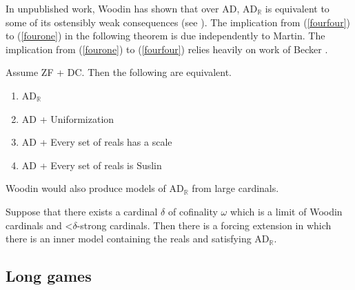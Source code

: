 \documentclass{book}%
\newcommand{\less}{\mathord{<}}
\begin{document}
In unpublished work, Woodin has shown that over AD, AD$_{\mathbb{R}}$ is equivalent
to some of its ostensibly weak consequences (see \cite{Woodin:1999}). The implication from (\ref{fourfour}) to
(\ref{fourone}) in the following theorem is due independently to Martin. The implication from (\ref{fourone}) to
(\ref{fourfour}) relies heavily on work of Becker .

\begin{theorem}\label{adrequiv} Assume {\rm ZF + DC}. Then the following are
equivalent.
\begin{enumerate}
\item\label{fourone} {\rm AD}$_{\mathbb{R}}$
\item\label{fourtwo} {\rm AD} + Uniformization
\item\label{fourthree} {\rm AD} + Every set of reals has a scale
\item\label{fourfour} {\rm AD} + Every set of reals is Suslin
\end{enumerate}
\end{theorem}



Woodin would also produce models of AD$_{\mathbb{R}}$ from large cardinals.

\begin{theorem} Suppose that there exists a cardinal $\delta$ of
cofinality $\omega$ which is a limit of Woodin cardinals and $\less\delta$-strong cardinals.
Then there is a forcing extension in which there is an inner model containing the reals and satisfying
{\rm AD}$_{\mathbb{R}}$.
\end{theorem}

\subsection{Long games}\label{longgames}
\end{document}
